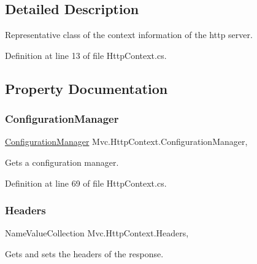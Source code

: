 \subsection{Detailed Description}
Representative class of the context information of the http server. 



Definition at line 13 of file Http\+Context.\+cs.



\subsection{Property Documentation}
\mbox{\label{class_mvc_1_1_http_context_aa5b6a4fb30772a7739a61b2788b21921}} 
\subsubsection{\texorpdfstring{Configuration\+Manager}{ConfigurationManager}}
{\footnotesize\ttfamily \hyperlink{class_mvc_1_1_configuration_manager}{Configuration\+Manager} Mvc.\+Http\+Context.\+Configuration\+Manager\hspace{0.3cm}{\ttfamily [get]}, {\ttfamily [set]}}



Gets a configuration manager. 



Definition at line 69 of file Http\+Context.\+cs.

\mbox{\label{class_mvc_1_1_http_context_a353d7d8e5410d7483df18887824d9e03}} 
\subsubsection{\texorpdfstring{Headers}{Headers}}
{\footnotesize\ttfamily Name\+Value\+Collection Mvc.\+Http\+Context.\+Headers\hspace{0.3cm}{\ttfamily [get]}, {\ttfamily [set]}}



Gets and sets the headers of the response. 



